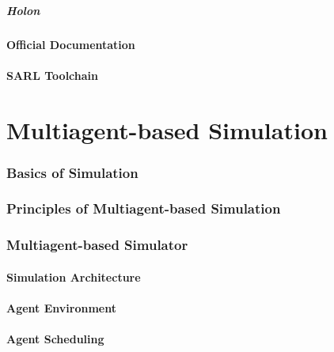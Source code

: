 \begin{bibliographysection}
	\subsubsection{Holon}
	\localized
	\subsection{Official Documentation}
	\localized
	\subsection{SARL Toolchain}
	\localized

\end{bibliographysection}

\part{Multiagent-based Simulation}
\begin{bibliographysection}

	\section[Simulation Basics]{Basics of Simulation}
	\localized

	\section[MABS Principles]{Principles of Multiagent-based Simulation}
	\localized
	\section[MABS Simulator]{Multiagent-based Simulator}
	\subsection{Simulation Architecture}
	\localized
	\subsection{Agent Environment}
	\localized
	\subsection{Agent Scheduling}
	\localized

	\thanksslide
\end{bibliographysection}

